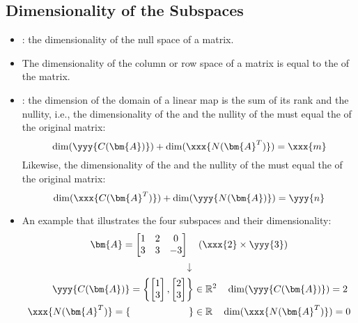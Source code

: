 \begin{itemize}
  \subsection{Dimensionality of the Subspaces}\label{Dimensionality of the Subspaces}
  \begin{itemize}
    \item {}: the dimensionality of the null space of a matrix.
    \item The dimensionality of the column or row space of a matrix is equal to the \hyperref[Rank Terminology]{} of the matrix.
    \item {}: the dimension of the domain of a linear map is the sum of its rank and the nullity, i.e., the dimensionality of the  and the nullity of the  must equal the  of the original matrix: 
    \[%
      \dim(\yyy{C(\bm{A})}) + \dim(\xxx{N(\bm{A}^T)}) = \xxx{m}
    \]%
    Likewise, the dimensionality of the  and the nullity of the  must equal the  of the original matrix:
    \[%
      \dim(\xxx{C(\bm{A}^T)}) + \dim(\yyy{N(\bm{A})}) = \yyy{n}
    \]%
    \item An example that illustrates the four subspaces and their dimensionality:
    \[%
    \bm{A} = \begin{bmatrix}
      1 & 2 & 0 \\
      3 & 3 & -3
      \end{bmatrix} \quad (\xxx{2}\times\yyy{3})
    \]%
    \[%
    \downarrow
    \]%
    \begin{align*}
      \yyy{C(\bm{A})} = \left\{ 
        \begin{bmatrix} 1 \\ 3 \end{bmatrix},
        \begin{bmatrix} 2 \\ 3 \end{bmatrix}
      \right\} &\in \mathbb{R}^2 \quad \dim(\yyy{C(\bm{A})}) = 2 \\
      \xxx{N(\bm{A}^T)} = \left\{\hspace{60pt}\right\} &\in \mathbb{R} \quad \dim(\xxx{N(\bm{A}^T)}) = 0 \\

\end{align*}
\end{itemize}
\end{itemize}
